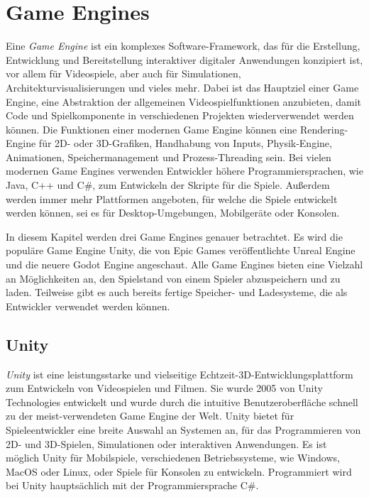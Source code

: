 \chapter{Game Engines}\label{ch:gameengines}
Eine \textit{Game Engine} ist ein komplexes Software-Framework, das für die Erstellung, Entwicklung und Bereitstellung interaktiver digitaler Anwendungen konzipiert ist, vor allem für Videospiele, aber auch für Simulationen, Architekturvisualisierungen und vieles mehr. Dabei ist das Hauptziel einer Game Engine, eine Abstraktion der allgemeinen Videospielfunktionen anzubieten, damit Code und Spielkomponente in verschiedenen Projekten wiederverwendet werden können. Die Funktionen einer modernen Game Engine können eine Rendering-Engine für 2D- oder 3D-Grafiken, Handhabung von Inputs, Physik-Engine, Animationen, Speichermanagement und Prozess-Threading sein. Bei vielen modernen Game Engines verwenden Entwickler höhere Programmiersprachen, wie Java, C++ und C\#, zum Entwickeln der Skripte für die Spiele. Außerdem werden immer mehr Plattformen angeboten, für welche die Spiele entwickelt werden können, sei es für Desktop-Umgebungen, Mobilgeräte oder Konsolen.\cite{andrade2015game}

In diesem Kapitel werden drei Game Engines genauer betrachtet. Es wird die populäre Game Engine Unity\cite{vsmid2017comparison}, die von Epic Games veröffentlichte Unreal Engine und die neuere Godot Engine angeschaut. Alle Game Engines bieten eine Vielzahl an Möglichkeiten an, den Spielstand von einem Spieler abzuspeichern und zu laden. Teilweise gibt es auch bereits fertige Speicher- und Ladesysteme, die als Entwickler verwendet werden können.



\section{Unity}
\textit{Unity} ist eine leistungsstarke und vielseitige Echtzeit-3D-Entwicklungsplattform zum Entwickeln von Videospielen und Filmen. Sie wurde 2005 von Unity Technologies entwickelt und wurde durch die intuitive Benutzeroberfläche schnell zu der meist-verwendeten Game Engine der Welt. Unity bietet für Spieleentwickler eine breite Auswahl an Systemen an, für das Programmieren von 2D- und 3D-Spielen, Simulationen oder interaktiven Anwendungen. Es ist möglich Unity für Mobilspiele, verschiedenen Betriebssysteme, wie Windows, MacOS oder Linux, oder Spiele für Konsolen zu entwickeln. Programmiert wird bei Unity hauptsächlich mit der Programmiersprache C\#.\cite{unityUnityEngine}\cite{vsmid2017comparison}


